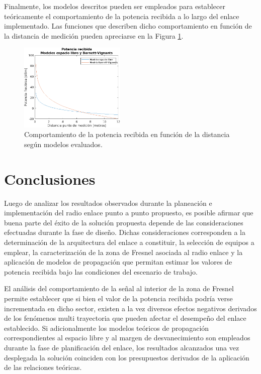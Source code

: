 \documentclass[conference]{IEEEtran}
\begin{document}
Finalmente, los modelos descritos pueden ser empleados para establecer teóricamente el comportamiento de la potencia 
recibida a lo largo del enlace implementado. Las funciones que describen dicho comportamiento en función de la distancia 
de medición pueden apreciarse en la Figura \ref{fig:Potencia_Modelos}. 
\begin{figure}
    \centering
          \includegraphics[width=0.45\textwidth]{Potencia_Modelos.png}
        \caption{Comportamiento de la potencia recibida en función de la distancia según modelos evaluados.
        }
        \label{fig:Potencia_Modelos}
\end{figure}
\section{Conclusiones}
Luego de analizar los resultados observados durante la planeación e implementación del radio enlace punto a punto propuesto,
es posible afirmar que buena parte del éxito de la solución propuesta depende de las consideraciones efectuadas durante la fase
de diseño. Dichas consideraciones corresponden a la determinación de la arquitectura del enlace a constituir, la selección de equipos a emplear, 
la caracterización de la zona de Fresnel asociada al radio enlace y la aplicación de modelos de propagación que permitan estimar 
los valores de potencia recibida bajo las condiciones del escenario de trabajo. 

El análisis del comportamiento de la señal al interior de la zona de Fresnel permite establecer que si bien el valor de la potencia
recibida podría verse incrementada en dicho sector, existen a la vez diversos efectos negativos derivados de los fenómenos multi trayectoria
que pueden afectar el desempeño del enlace establecido. Si adicionalmente los modelos teóricos de propagación correspondientes al espacio libre y 
al margen de desvanecimiento son empleados durante la fase de planificación del enlace, los resultados alcanzados una vez desplegada la solución
coinciden con los presupuestos derivados de la aplicación de las relaciones teóricas.
\end{document}

